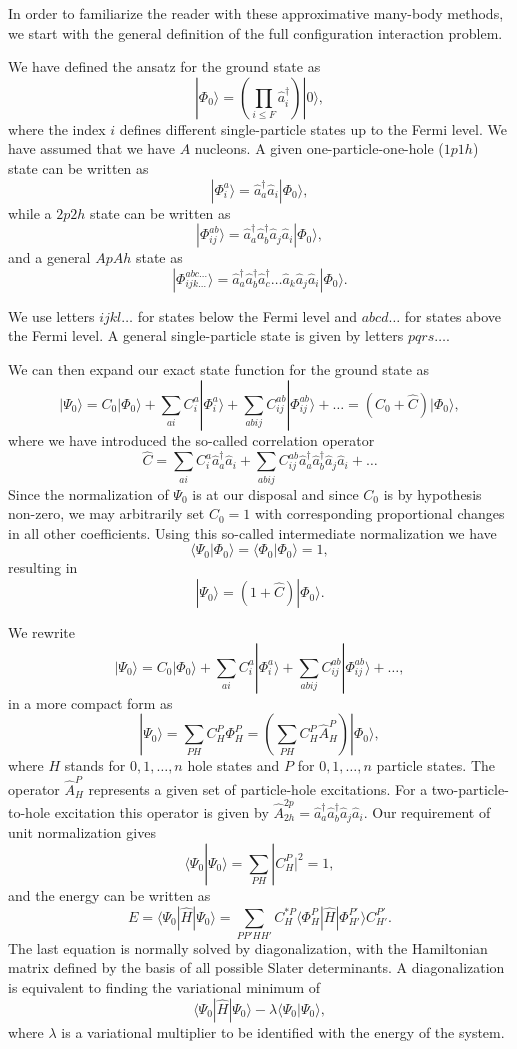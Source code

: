 In order to familiarize the reader with these approximative many-body
methods, we start with the general definition of the full
configuration interaction problem.

We have defined the ansatz for the ground state as 
\[
|\Phi_0\rangle = \left(\prod_{i\le F}\hat{a}_{i}^{\dagger}\right)|0\rangle,
\]
where the index $i$ defines different single-particle states up to the Fermi level. We have assumed that we have $A$ nucleons.
A given one-particle-one-hole ($1p1h$) state can be written as
\[
|\Phi_i^a\rangle = \hat{a}_{a}^{\dagger}\hat{a}_i|\Phi_0\rangle,
\]
while a $2p2h$ state can be written as
\[
|\Phi_{ij}^{ab}\rangle = \hat{a}_{a}^{\dagger}\hat{a}_{b}^{\dagger}\hat{a}_j\hat{a}_i|\Phi_0\rangle,
\]
and a general $ApAh$ state as 
\[
|\Phi_{ijk\dots}^{abc\dots}\rangle = \hat{a}_{a}^{\dagger}\hat{a}_{b}^{\dagger}\hat{a}_{c}^{\dagger}\dots\hat{a}_k\hat{a}_j\hat{a}_i|\Phi_0\rangle.
\]

We use letters $ijkl\dots$ for states below the Fermi level and $abcd\dots$ for states above the Fermi level. A general single-particle state is given by letters $pqrs\dots$.

We can then expand our exact state function for the ground state 
as
\[
|\Psi_0\rangle=C_0|\Phi_0\rangle+\sum_{ai}C_i^a|\Phi_i^a\rangle+\sum_{abij}C_{ij}^{ab}|\Phi_{ij}^{ab}\rangle+\dots
=(C_0+\hat{C})|\Phi_0\rangle,
\]
where we have introduced the so-called correlation operator 
\[
\hat{C}=\sum_{ai}C_i^a\hat{a}_{a}^{\dagger}\hat{a}_i  +\sum_{abij}C_{ij}^{ab}\hat{a}_{a}^{\dagger}\hat{a}_{b}^{\dagger}\hat{a}_j\hat{a}_i+\dots
\]
Since the normalization of $\Psi_0$ is at our disposal and since $C_0$ is by hypothesis non-zero, we may arbitrarily set $C_0=1$ with 
corresponding proportional changes in all other coefficients. Using this so-called intermediate normalization we have
\[
\langle \Psi_0 | \Phi_0 \rangle = \langle \Phi_0 | \Phi_0 \rangle = 1, 
\]
resulting in 
\[
|\Psi_0\rangle=(1+\hat{C})|\Phi_0\rangle.
\]


We rewrite 
\[
|\Psi_0\rangle=C_0|\Phi_0\rangle+\sum_{ai}C_i^a|\Phi_i^a\rangle+\sum_{abij}C_{ij}^{ab}|\Phi_{ij}^{ab}\rangle+\dots,
\]
in a more compact form as 
\[
|\Psi_0\rangle=\sum_{PH}C_H^P\Phi_H^P=\left(\sum_{PH}C_H^P\hat{A}_H^P\right)|\Phi_0\rangle,
\]
where $H$ stands for $0,1,\dots,n$ hole states and $P$ for $0,1,\dots,n$ particle states. The operator 
$\hat{A}_H^P$ represents a given set of particle-hole excitations. For a two-particle-to-hole excitation this operator is given by
$\hat{A}_{2h}^{2p}=\hat{a}_{a}^{\dagger}\hat{a}_{b}^{\dagger}\hat{a}_j\hat{a}_i$.
Our requirement of unit normalization gives
\[
\langle \Psi_0 | \Psi_0 \rangle = \sum_{PH}|C_H^P|^2= 1,
\]
and the energy can be written as 
\[
E= \langle \Psi_0 | \hat{H} |\Psi_0 \rangle= \sum_{PP'HH'}C_H^{*P}\langle \Phi_H^P | \hat{H} |\Phi_{H'}^{P'} \rangle C_{H'}^{P'}.
\]
The last equation is normally
solved by diagonalization, with the Hamiltonian matrix defined by the basis of all possible Slater determinants. A diagonalization
is equivalent to finding the variational minimum   of 
\[
 \langle \Psi_0 | \hat{H} |\Psi_0 \rangle-\lambda \langle \Psi_0 |\Psi_0 \rangle,
\]
where $\lambda$ is a variational multiplier to be identified with the energy of the system.

